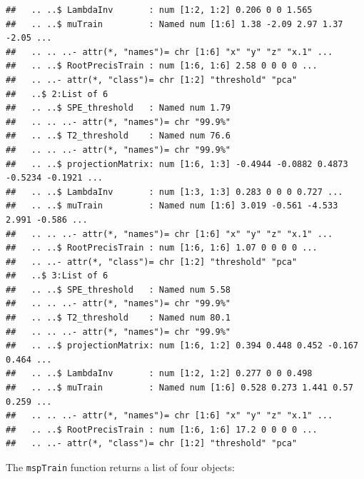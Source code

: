 \documentclass{report}\usepackage[]{graphicx}\usepackage[]{color}
\makeatletter
\newenvironment{kframe}{%
 \def\at@end@of@kframe{}%
 \ifinner\ifhmode%
  \def\at@end@of@kframe{\end{minipage}}%
  \begin{minipage}{\columnwidth}%
 \fi\fi%
 \def\FrameCommand##1{\hskip\@totalleftmargin \hskip-\fboxsep
 \colorbox{shadecolor}{##1}\hskip-\fboxsep
     \hskip-\linewidth \hskip-\@totalleftmargin \hskip\columnwidth}%
 \MakeFramed {\advance\hsize-\width
   \@totalleftmargin\z@ \linewidth\hsize
   \@setminipage}}%
 {\par\unskip\endMakeFramed%
 \at@end@of@kframe}
\newenvironment{knitrout}{}{} %
\makeatother
\begin{document}
\begin{knitrout}
\begin{kframe}
\begin{verbatim}
##   .. ..$ LambdaInv       : num [1:2, 1:2] 0.206 0 0 1.565
##   .. ..$ muTrain         : Named num [1:6] 1.38 -2.09 2.97 1.37 -2.05 ...
##   .. .. ..- attr(*, "names")= chr [1:6] "x" "y" "z" "x.1" ...
##   .. ..$ RootPrecisTrain : num [1:6, 1:6] 2.58 0 0 0 0 ...
##   .. ..- attr(*, "class")= chr [1:2] "threshold" "pca"
##   ..$ 2:List of 6
##   .. ..$ SPE_threshold   : Named num 1.79
##   .. .. ..- attr(*, "names")= chr "99.9%"
##   .. ..$ T2_threshold    : Named num 76.6
##   .. .. ..- attr(*, "names")= chr "99.9%"
##   .. ..$ projectionMatrix: num [1:6, 1:3] -0.4944 -0.0882 0.4873 -0.5234 -0.1921 ...
##   .. ..$ LambdaInv       : num [1:3, 1:3] 0.283 0 0 0 0.727 ...
##   .. ..$ muTrain         : Named num [1:6] 3.019 -0.561 -4.533 2.991 -0.586 ...
##   .. .. ..- attr(*, "names")= chr [1:6] "x" "y" "z" "x.1" ...
##   .. ..$ RootPrecisTrain : num [1:6, 1:6] 1.07 0 0 0 0 ...
##   .. ..- attr(*, "class")= chr [1:2] "threshold" "pca"
##   ..$ 3:List of 6
##   .. ..$ SPE_threshold   : Named num 5.58
##   .. .. ..- attr(*, "names")= chr "99.9%"
##   .. ..$ T2_threshold    : Named num 80.1
##   .. .. ..- attr(*, "names")= chr "99.9%"
##   .. ..$ projectionMatrix: num [1:6, 1:2] 0.394 0.448 0.452 -0.167 0.464 ...
##   .. ..$ LambdaInv       : num [1:2, 1:2] 0.277 0 0 0.498
##   .. ..$ muTrain         : Named num [1:6] 0.528 0.273 1.441 0.57 0.259 ...
##   .. .. ..- attr(*, "names")= chr [1:6] "x" "y" "z" "x.1" ...
##   .. ..$ RootPrecisTrain : num [1:6, 1:6] 17.2 0 0 0 0 ...
##   .. ..- attr(*, "class")= chr [1:2] "threshold" "pca"
\end{verbatim}
\end{kframe}
\end{knitrout}
The \texttt{mspTrain} function returns a list of four objects:
\end{document}
